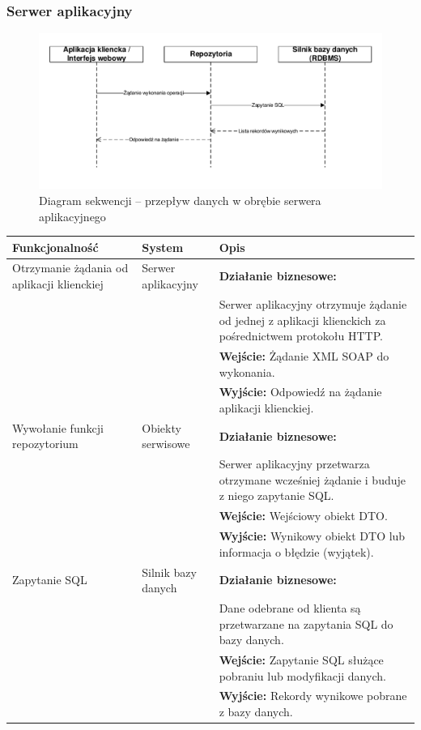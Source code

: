 \documentclass[10pt,a4paper]{article}
\begin{document}
\subsubsection{Serwer aplikacyjny}
\begin{figure}[H]
	\includegraphics[width=16cm]{Resources/PDF/sequence-server.pdf}
	\caption{Diagram sekwencji -- przepływ danych w obrębie serwera aplikacyjnego}
\end{figure}
\begin{table}[H]
	\begin{tabularx}{\textwidth}{|l|l|X|}
		\hline
		\textbf{Funkcjonalność} & \textbf{System} & \textbf{Opis} \\
		\hline
		Otrzymanie żądania od aplikacji klienckiej &
		Serwer aplikacyjny &
		\textbf{Działanie biznesowe:} \\
		& & Serwer aplikacyjny otrzymuje żądanie od jednej z aplikacji klienckich za pośrednictwem protokołu HTTP. \\
		& & \textbf{Wejście:} Żądanie XML SOAP do wykonania. \\
		& & \textbf{Wyjście:} Odpowiedź na żądanie aplikacji klienckiej. \\
		\hline
		Wywołanie funkcji repozytorium &
		Obiekty serwisowe &
		\textbf{Działanie biznesowe:} \\
		& & Serwer aplikacyjny przetwarza otrzymane wcześniej żądanie i buduje z niego zapytanie SQL. \\
		& & \textbf{Wejście:} Wejściowy obiekt DTO. \\
		& & \textbf{Wyjście:} Wynikowy obiekt DTO lub informacja o błędzie (wyjątek). \\
		\hline
		Zapytanie SQL &
		Silnik bazy danych &
		\textbf{Działanie biznesowe:} \\
		& & Dane odebrane od klienta są przetwarzane na zapytania SQL do bazy danych. \\
		& & \textbf{Wejście:} Zapytanie SQL służące pobraniu lub modyfikacji danych. \\
		& & \textbf{Wyjście:} Rekordy wynikowe pobrane z bazy danych. \\
		\hline
	\end{tabularx}
\end{table}
\end{document}
